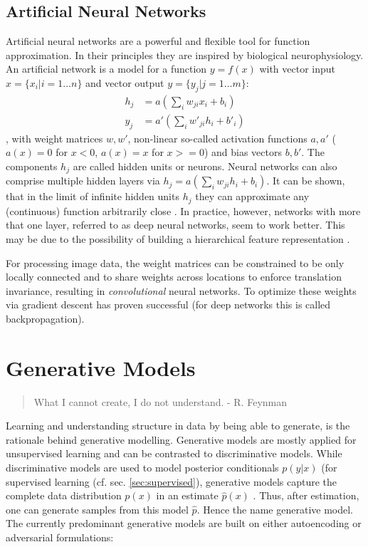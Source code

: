 	\subsection{Artificial Neural Networks}\label{sec:neuralnetworks}
		Artificial neural networks are a powerful and flexible tool for function approximation. In their principles they are inspired by biological neurophysiology. An artificial network is a model for a function $y = f(x)$ with vector input $x = \{ x_i | i = 1 \ldots n \}$ and vector output $y = \{ y_j | j = 1 \ldots m \}$:
		\begin{equation} \label{eq1}
			\begin{split}
				h_j & =  a (\sum_i w_{ji} x_i + b_i)  \\
				y_j & =  a' (\sum_i w'_{ji} h_i + b'_i)
			\end{split}
		\end{equation},
		with weight matrices $w, w'$, non-linear so-called activation functions $a, a'$ (\eg $a(x)=0$ for $x<0$, $a(x)=x$ for $x>=0$) and bias vectors $b, b'$.
		The components $h_j$ are called hidden units or neurons. Neural networks can also comprise multiple hidden layers via $h_j  =  a (\sum_i w_{ji} h_i + b_i)$.
		It can be shown, that in the limit of infinite hidden units $h_j$ they can approximate any (continuous) function arbitrarily close \cite{cybenko89approx, hornik91approx}.
		In practice, however, networks with more that one layer, referred to as deep neural networks, seem to work better. This may be due to the possibility of building a hierarchical feature representation \cite{zeiler14vis}.

		For processing image data, the weight matrices can be constrained to be only locally connected and to share weights across locations to enforce translation invariance, resulting in \textit{convolutional} neural networks.
		To optimize these weights via gradient descent has proven successful (for deep networks this is called backpropagation).

\section{Generative Models}\label{sec:genmodel}
	\begin{quote}
	    What I cannot create, I do not understand. - R. Feynman
	\end{quote}
	Learning and understanding structure in data by being able to generate, is the rationale behind generative modelling.
	Generative models are mostly applied for unsupervised learning and can be contrasted to discriminative models. While discriminative models are used to model posterior conditionals $p(y|x)$ (\eg for supervised learning (cf. sec. \ref{sec:supervised}), generative models capture the complete data distribution $p(x)$ in an estimate $\hat p(x)$ \cite{bishop06ml}. Thus, after estimation, one can generate samples from this model $\hat p$. Hence the name generative model.
	The currently predominant generative models are built on either autoencoding or adversarial formulations:


